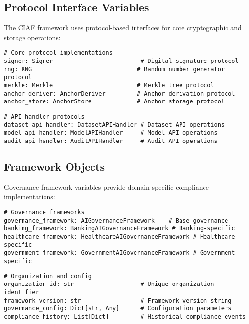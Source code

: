 \documentclass[12pt,a4paper]{article}
\begin{document}
\subsection{Protocol Interface Variables}

The CIAF framework uses protocol-based interfaces for core cryptographic and storage operations:

\begin{lstlisting}[caption=Core Protocol Implementations]
# Core protocol implementations
signer: Signer                         # Digital signature protocol
rng: RNG                              # Random number generator protocol
merkle: Merkle                        # Merkle tree protocol
anchor_deriver: AnchorDeriver         # Anchor derivation protocol
anchor_store: AnchorStore             # Anchor storage protocol
\end{lstlisting}

\begin{lstlisting}[caption=API Handler Protocols]
# API handler protocols
dataset_api_handler: DatasetAPIHandler # Dataset API operations
model_api_handler: ModelAPIHandler     # Model API operations
audit_api_handler: AuditAPIHandler     # Audit API operations
\end{lstlisting}

\subsection{Framework Objects}

Governance framework variables provide domain-specific compliance implementations:

\begin{lstlisting}[caption=Governance Frameworks]
# Governance frameworks
governance_framework: AIGovernanceFramework    # Base governance
banking_framework: BankingAIGovernanceFramework # Banking-specific
healthcare_framework: HealthcareAIGovernanceFramework # Healthcare-specific
government_framework: GovernmentAIGovernanceFramework # Government-specific
\end{lstlisting}

\begin{lstlisting}[caption=Organization and Configuration]
# Organization and config
organization_id: str                   # Unique organization identifier
framework_version: str                 # Framework version string
governance_config: Dict[str, Any]      # Configuration parameters
compliance_history: List[Dict]         # Historical compliance events
\end{lstlisting}
\end{document}
